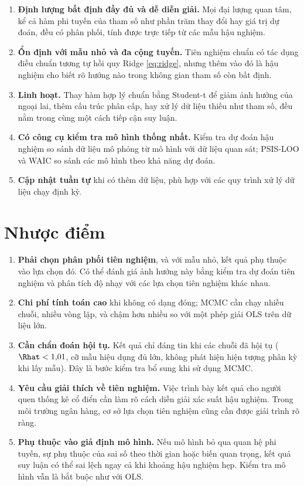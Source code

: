 \documentclass[12pt,a4paper]{report}
\begin{document}
\begin{enumerate}
  \item \textbf{Định lượng bất định đầy đủ và dễ diễn giải.} Mọi đại lượng quan
    tâm, kể cả hàm phi tuyến của tham số như phần trăm thay đổi hay giá trị dự
    đoán, đều có phân phối, tính được trực tiếp từ các mẫu hậu nghiệm.
  \item \textbf{Ổn định với mẫu nhỏ và đa cộng tuyến.} Tiên nghiệm chuẩn có tác dụng điều chuẩn tương tự hồi quy Ridge
    \eqref{eq:ridge}, nhưng thêm vào đó là hậu nghiệm cho biết rõ hướng nào trong
    không gian tham số còn bất định.
  \item \textbf{Linh hoạt.} Thay hàm hợp lý chuẩn bằng Student-t để giảm ảnh hưởng của ngoại lai,
    thêm cấu trúc phân cấp, hay xử lý dữ liệu thiếu như tham số, đều nằm trong cùng một cách tiếp cận suy luận.
  \item \textbf{Có công cụ kiểm tra mô hình thống nhất.} Kiểm tra dự đoán hậu nghiệm
    so sánh dữ liệu mô phỏng từ mô hình với dữ liệu quan sát; PSIS-LOO và WAIC \cite{vehtari2017loo}
    so sánh các mô hình theo khả năng dự đoán.
  \item \textbf{Cập nhật tuần tự} khi có thêm dữ liệu, phù hợp với các quy trình xử lý dữ liệu
    chạy định kỳ.
\end{enumerate}

\section{Nhược điểm}

\begin{enumerate}
  \item \textbf{Phải chọn phân phối tiên nghiệm}, và với mẫu nhỏ, kết quả phụ thuộc vào lựa chọn
    đó. Có thể đánh giá ảnh hưởng này bằng kiểm tra dự đoán tiên nghiệm và phân
    tích độ nhạy với các lựa chọn tiên nghiệm khác nhau.
  \item \textbf{Chi phí tính toán cao} khi không có dạng đóng; MCMC cần chạy nhiều
    chuỗi, nhiều vòng lặp, và chậm hơn nhiều so với một phép giải OLS trên dữ
    liệu lớn.
  \item \textbf{Cần chẩn đoán hội tụ.} Kết quả chỉ đáng tin khi các chuỗi đã hội
    tụ ($\Rhat < 1{,}01$, cỡ mẫu hiệu dụng đủ lớn, không phát hiện hiện tượng phân kỳ khi lấy mẫu). Đây là bước kiểm tra bổ sung khi sử dụng MCMC.
  \item \textbf{Yêu cầu giải thích về tiên nghiệm.} Việc trình bày kết quả cho người quen
    thống kê cổ điển cần làm rõ cách diễn giải xác suất hậu nghiệm. Trong môi
    trường ngân hàng, cơ sở lựa chọn tiên nghiệm cũng cần được giải trình rõ ràng.
  \item \textbf{Phụ thuộc vào giả định mô hình.} Nếu mô hình bỏ qua quan hệ phi tuyến,
    sự phụ thuộc của sai số theo thời gian hoặc biến quan trọng, kết quả suy
    luận có thể sai lệch ngay cả khi khoảng hậu nghiệm hẹp. Kiểm tra mô hình vẫn
    là bắt buộc như với OLS.
\end{enumerate}
\end{document}

